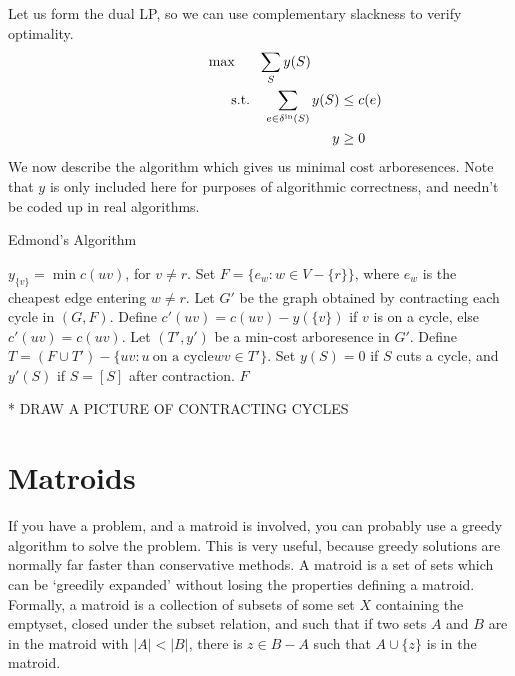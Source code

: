 Let us form the dual LP, so we can use complementary slackness to verify optimality.
%
\begin{gather*}
\max \quad\ \ \sum_S y(S) \\
\begin{aligned}
\ \ \ \ \ \ \ \ \ \ \ \ \ \ \ \ \ \ \ \ \textup{s.t.} \quad \sum_{e \in \delta^{\text{in}}(S)} y(S) &\leq c(e)\\
                  y &\geq 0
\end{aligned}
\end{gather*}
%
We now describe the algorithm which gives us minimal cost arboresences. Note that $y$ is only included here for purposes of algorithmic correctness, and needn't be coded up in real algorithms.

\begin{algorithm}
\caption{Edmond's Algorithm}
\begin{algorithmic}[1]
\State $y_{\{ v \}} = \min c(uv)$, for $v \neq r$.
\State Set $F = \{ e_w : w \in V - \{ r \} \}$, where $e_w$ is the cheapest edge entering $w \neq r$.
\State Let $G'$ be the graph obtained by contracting each cycle in $(G,F)$.
\State Define $c'(uv) = c(uv) - y(\{v\})$ if $v$ is on a cycle, else $c'(uv) = c(uv)$.
\State Let $(T',y')$ be a min-cost arboresence in $G'$.
\State Define $T = (F \cup T') - \{ uv : u\ \text{on a cycle} wv \in T' \}$.
\State Set $y(S) = 0$ if $S$ cuts a cycle, and $y'(S)$ if $S = [S]$ after contraction.
\EndWhile
\State \Return $F$
\end{algorithmic}
\end{algorithm}

* DRAW A PICTURE OF CONTRACTING CYCLES

\chapter{Matroids}

If you have a problem, and a matroid is involved, you can probably use a greedy algorithm to solve the problem. This is very useful, because greedy solutions are normally far faster than conservative methods. A matroid is a set of sets which can be `greedily expanded' without losing the properties defining a matroid. Formally, a matroid is a collection of subsets of some set $X$ containing the emptyset, closed under the subset relation, and such that if two sets $A$ and $B$ are in the matroid with $|A| < |B|$, there is $z \in B - A$ such that $A \cup \{ z \}$ is in the matroid.

